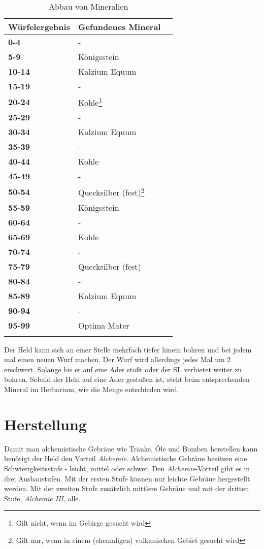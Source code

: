 \begin{longtable}{|p{4cm}|p{5cm}|p{4cm}|}
\hline
\textbf{Würfelergebnis} & \textbf{Gefundenes Mineral}\\ \hline
\textbf{0-4} & - \\ \hline
\textbf{5-9} & Königsstein \\ \hline
\textbf{10-14} & Kalzium Equum \\ \hline
\textbf{15-19} & - \\ \hline
\textbf{20-24} & Kohle\footnote{Gilt nicht, wenn im Gebirge gesucht wird} \\ \hline
\textbf{25-29} & - \\ \hline
\textbf{30-34} & Kalzium Equum \\ \hline
\textbf{35-39} & - \\ \hline
\textbf{40-44} & Kohle \\ \hline
\textbf{45-49} & - \\ \hline
\textbf{50-54} & Quecksilber (fest)\footnote{Gilt nur, wenn in einem (ehemaligen) vulkanischen Gebiet gesucht wird} \\ \hline
\textbf{55-59} & Königsstein \\ \hline
\textbf{60-64} & - \\ \hline
\textbf{65-69} & Kohle \\ \hline
\textbf{70-74} & - \\ \hline
\textbf{75-79} & Quecksilber (fest) \\ \hline
\textbf{80-84} & - \\ \hline
\textbf{85-89} & Kalzium Equum \\ \hline
\textbf{90-94} & - \\ \hline
\textbf{95-99} & Optima Mater \\ \hline

\caption{Abbau von Mineralien}
\label{tab:abbau_von_mineralien}
\end{longtable}

Der Held kann sich an einer Stelle mehrfach tiefer hinein bohren und bei jedem mal einen neuen Wurf machen. Der Wurf wird allerdings jedes Mal um 2 erschwert. Solange bis er auf eine Ader stößt oder der SL verbietet weiter zu bohren. Sobald der Held auf eine Ader gestoßen ist, steht beim entsprechenden Mineral im Herbarium, wie die Menge entschieden wird.

\section{Herstellung}
Damit man alchemistische Gebräue wie Tränke, Öle und Bomben herstellen kann benötigt der Held den Vorteil \textit{Alchemie}. Alchemistische Gebräue besitzen eine Schwierigkeitsstufe - leicht, mittel oder schwer. Den \textit{Alchemie}-Vorteil gibt es in drei Ausbaustufen. Mit der ersten Stufe können nur leichte Gebräue hergestellt werden. Mit der zweiten Stufe zusätzlich mittlere Gebräue und mit der dritten Stufe, \textit{Alchemie III}, alle. 

